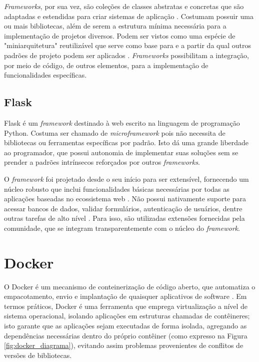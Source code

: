 \emph{Frameworks}, por sua vez, são coleções de classes abstratas e concretas que são adaptadas e estendidas para criar sistemas de aplicação \cite{Sommerville2011}. Costumam possuir uma ou mais bibliotecas, além de serem a estrutura mínima necessária para a implementação de projetos diversos. Podem ser vistos como uma espécie de "miniarquitetura" reutilizável que serve como base para e a partir da qual outros padrões de projeto podem ser aplicados \cite{Pressman2021-jj}. \emph{Frameworks} possibilitam a integração, por meio de código, de outros elementos, para a implementação de funcionalidades específicas.

\subsection{Flask}
Flask é um \emph{framework} destinado à web escrito na linguagem de programação Python. Costuma ser chamado de \emph{microframework} pois não necessita de bibliotecas ou ferramentas específicas por padrão. Isto dá uma grande liberdade ao programador, que possui autonomia de implementar suas soluções sem se prender a padrões intrínsecos reforçados por outros \emph{frameworks}.

O \emph{framework} foi projetado desde o seu início para ser extensível, fornecendo um núcleo robusto que inclui funcionalidades básicas necessárias por todas as aplicações baseadas no ecossistema web \cite{Grinberg2018-nz}. Não possui nativamente suporte para acessar bancos de dados, validar formulários, autenticação de usuários, dentre outras tarefas de alto nível \cite{Grinberg2018-nz}. Para isso, são utilizadas extensões fornecidas pela comunidade, que se integram transparentemente com o núcleo do \emph{framework}.

\section{Docker}
O Docker é um mecanismo de conteinerização de código aberto, que automatiza o empacotamento, envio e implantação de quaisquer aplicativos de software \cite{Raj2015-ju}. Em termos práticos, Docker é uma ferramenta que emprega virtualização a nível de sistema operacional, isolando aplicações em estruturas chamadas de contêineres; isto garante que as aplicações sejam executadas de forma isolada, agregando as dependências necessárias dentro do próprio contêiner (como expresso na Figura \ref{fig:docker_diagrama}), evitando assim problemas provenientes de conflitos de versões de bibliotecas.

